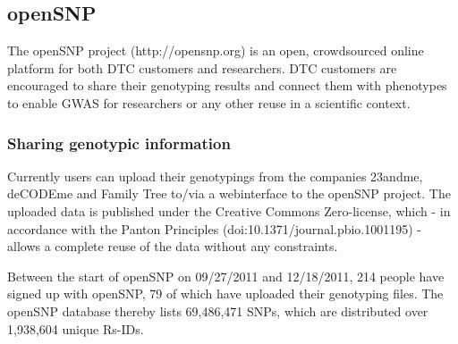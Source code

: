 \documentclass[10pt]{article}
\begin{document}
\subsection*{openSNP}

The openSNP project (http://opensnp.org) is an open, crowdsourced online platform for both DTC customers and researchers. DTC customers are encouraged to share their genotyping results and connect them with phenotypes to enable GWAS for researchers or any other reuse in a scientific context. 
\begin{comment}
FZ: That is a good summary, but as Bastian pointed out the reuse is not only
enabled in a scientific context?
\end{comment}

\begin{comment}
FZ:
\end{comment}
\subsubsection*{Sharing genotypic information}
Currently users can upload their genotypings from the companies 23andme, deCODEme and Family Tree to/via a webinterface to the openSNP 
project. The uploaded data is published under the Creative Commons Zero-license, 
which - in accordance with the Panton Principles (doi:10.1371/journal.pbio.1001195) - 
allows a complete reuse of the data without any constraints.
\begin{comment}
FZ: If that is true, rephrase sentence above
FZ: Made two sentences out of one.
\end{comment}
Between the start of openSNP on 09/27/2011 and 12/18/2011, 214 people have signed 
up with openSNP, 79 of which have uploaded their genotyping files. The openSNP 
database thereby lists 69,486,471 SNPs, which are distributed over 1,938,604 unique Rs-IDs.
\end{document}
